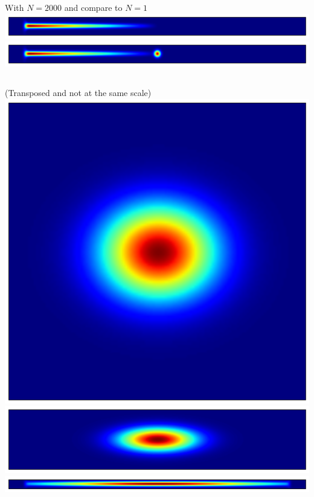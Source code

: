 \documentclass[10pt,fleqn]{article}
\begin{document}
With $N=2000$ and compare to $N=1$\\
\includegraphics[width=15cm]{3-3-2000.png}\\
\includegraphics[width=15cm]{3-3-2000_0.png}

\subsection{}
(Transposed and not at the same scale)\\
\includegraphics[width=15cm]{3-4-02.png}\\
\includegraphics[width=15cm]{3-4-12.png}\\
\includegraphics[width=15cm]{3-4-4.png}

\subsection{}
\end{document}
